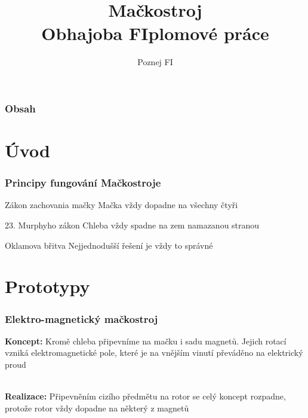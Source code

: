\documentclass{beamer}
\title[FIplomová práce]{\textbf{Mačkostroj}\\Obhajoba FIplomové práce}
\author{Poznej FI} %
\institute[FI MU] %
{
    Fakulta informatiky, Masarykova univerzita \\ %
    \medskip
    \textit{poznej@fi.muni.cz} %
}
\date{} %
\newcommand{\mypause}{}
\begin{document}
    
    \begin{frame}
    \titlepage %
\end{frame}

\begin{frame}
\frametitle{Obsah} %
\tableofcontents %
\end{frame}


\section{Úvod}
\begin{frame}
\frametitle{Principy fungování Mačkostroje}
\begin{block}{Zákon zachovania mačky}
Mačka vždy dopadne na všechny čtyři
\end{block}
\mypause
\begin{block}{23. Murphyho zákon}
Chleba vždy spadne na zem namazanou stranou
\end{block}
\mypause
\begin{block}{Oklamova břitva}
Nejjednodušší řešení je vždy to správné
\end{block}
\end{frame}

\section{Prototypy}
\begin{frame}
\frametitle{Elektro-magnetický mačkostroj}
    \textbf{Koncept:}  Kromě chleba připevníme na mačku i sadu magnetů. Jejich rotací vzniká elektromagnetické pole, které je na vnějším vinutí převáděno na elektrický proud
    \mypause
    \\
    \vspace*{5pt}
    \textbf{Realizace:}  Připevněním cizího předmětu na rotor se celý koncept rozpadne, protože rotor vždy dopadne na některý z magnetů
    
\end{frame}
\end{document}

